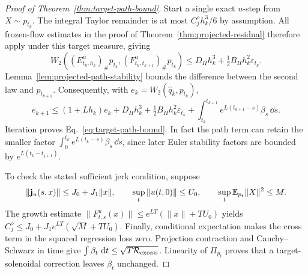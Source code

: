 \begin{proof}[Proof of Theorem~\ref{thm:target-path-bound}]
Start a single exact $u$-step from $X\sim p_{t_k}$.
The integral Taylor remainder is at most $C_j^\diamond h_k^3/6$ by
assumption.  All frozen-flow estimates in the proof of
Theorem~\ref{thm:projected-residual} therefore apply under this target
measure, giving
\[
 W_2((E^u_{t_k,h_k})_\#p_{t_k},
          (F^u_{t_k,t_{k+1}})_\#p_{t_k})
 \le D_Hh_k^3+\tfrac12B_Hh_k^2\varepsilon_{t_k}.
\]
Lemma~\ref{lem:projected-path-stability} bounds the difference between
the second law and $p_{t_{k+1}}$.  Consequently, with
$e_k=W_2(\widehat q_k,p_{t_k})$,
\[
 e_{k+1}\le(1+Lh_k)e_k+D_Hh_k^3
       +\tfrac12B_Hh_k^2\varepsilon_{t_k}
       +\int_{t_k}^{t_{k+1}}e^{L(t_{k+1}-s)}\beta_s\,\dd s.
\]
Iteration proves Eq.~\eqref{eq:target-path-bound}.  In fact the path
term can retain the smaller factor
$\int_0^{t_k}e^{L(t_k-s)}\beta_s\,\dd s$, since later Euler stability
factors are bounded by $e^{L(t_k-t_{j+1})}$.

To check the stated sufficient jerk condition, suppose
\[
 \|\mathbf j_u(s,x)\|\le J_0+J_1\|x\|,\qquad
 \sup_t\|u(t,0)\|\le U_0,\qquad
 \sup_t\mathbb E_{p_t}\|X\|^2\le M.
\]
The growth estimate
$\|F^u_{t,s}(x)\|\le e^{LT}(\|x\|+TU_0)$ yields
$C_j^\diamond\le J_0+J_1e^{LT}(\sqrt M+TU_0)$.
Finally, conditional expectation makes the cross term in the squared
regression loss zero.  Projection contraction and Cauchy--Schwarz in
time give $\int\beta_t\,\,\mathrm d t\le\sqrt{T\mathcal R_{\rm excess}}$.
Linearity of $\Pi_{p_t}$ proves that a target-solenoidal correction
leaves $\beta_t$ unchanged.
\end{proof}
